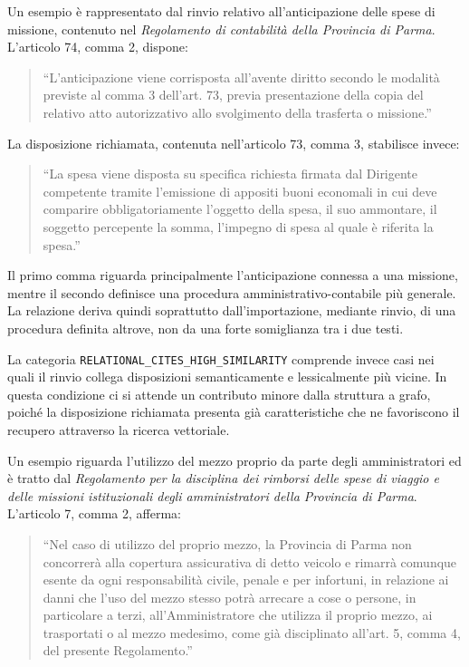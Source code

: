 Un esempio è rappresentato dal rinvio relativo all'anticipazione delle spese di missione, contenuto nel \emph{Regolamento di contabilità della Provincia di Parma}. L'articolo 74, comma 2, dispone:

\begin{quote}
``L'anticipazione viene corrisposta all'avente diritto secondo le modalità previste al comma 3 dell'art. 73, previa presentazione della copia del relativo atto autorizzativo allo svolgimento della trasferta o missione.''
\end{quote}

La disposizione richiamata, contenuta nell'articolo 73, comma 3, stabilisce invece:

\begin{quote}
``La spesa viene disposta su specifica richiesta firmata dal Dirigente competente tramite l'emissione di appositi buoni economali in cui deve comparire obbligatoriamente l'oggetto della spesa, il suo ammontare, il soggetto percepente la somma, l'impegno di spesa al quale è riferita la spesa.''
\end{quote}


Il primo comma riguarda principalmente l'anticipazione connessa a una missione, mentre il secondo definisce una procedura amministrativo-contabile più generale. La relazione deriva quindi soprattutto dall'importazione, mediante rinvio, di una procedura definita altrove, non da una forte somiglianza tra i due testi.

La categoria \texttt{RELATIONAL\_CITES\_HIGH\_SIMILARITY} comprende invece casi nei quali il rinvio collega disposizioni semanticamente e lessicalmente più vicine. In questa condizione ci si attende un contributo minore dalla struttura a grafo, poiché la disposizione richiamata presenta già caratteristiche che ne favoriscono il recupero attraverso la ricerca vettoriale.

Un esempio riguarda l'utilizzo del mezzo proprio da parte degli amministratori ed è tratto dal \emph{Regolamento per la disciplina dei rimborsi delle spese di viaggio e delle missioni istituzionali degli amministratori della Provincia di Parma}. L'articolo 7, comma 2, afferma:

\begin{quote}
``Nel caso di utilizzo del proprio mezzo, la Provincia di Parma non concorrerà alla copertura assicurativa di detto veicolo e rimarrà comunque esente da ogni responsabilità civile, penale e per infortuni, in relazione ai danni che l'uso del mezzo stesso potrà arrecare a cose o persone, in particolare a terzi, all'Amministratore che utilizza il proprio mezzo, ai trasportati o al mezzo medesimo, come già disciplinato all'art. 5, comma 4, del presente Regolamento.''
\end{quote}

